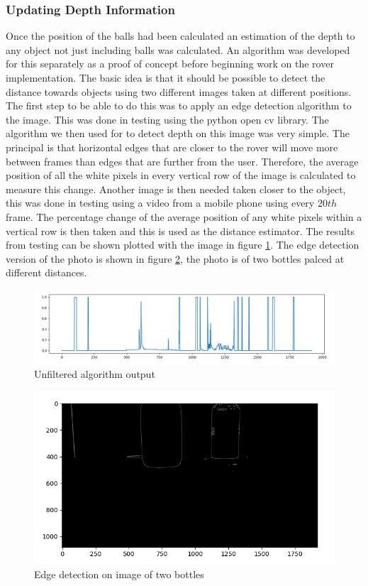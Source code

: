\documentclass[10pt,twoside]{article}
\begin{document}
\subsubsection{Updating Depth Information}
Once the position of the balls had been calculated an estimation of the depth to any object not just including balls was calculated. An algorithm was developed for this separately as a proof of concept before beginning work on the rover implementation. The basic idea is that it should be possible to detect the distance towards objects using two different images taken at different positions. The first step to be able to do this was to apply an edge detection algorithm to the image. This was done in testing using the python open cv library. The algorithm we then used for to detect depth on this image was very simple. The principal is that horizontal edges that are closer to the rover will move more between frames than edges that are further from the user. Therefore, the average position of all the white pixels in every vertical row of the image is calculated to measure this change. Another image is then needed taken closer to the object, this was done in testing using a video from a mobile phone using every $20th$ frame. The percentage change of the average position of any white pixels within a vertical row is then taken and this is used as the distance estimator. The results from testing can be shown plotted with the image in figure \ref{fig:CommandUnfilteredVision}. The edge detection version of the photo is shown in figure \ref{fig:Commandbottles}, the photo is of two bottles palced at different distances.

\begin{figure}[hbt]
    \centering
    \includegraphics[scale = 0.4]{Commandunfilteredvision.png}
    \caption{Unfiltered algorithm output}
    \label{fig:CommandUnfilteredVision}
\end{figure}


\begin{figure}[hbt]
    \centering
    \includegraphics[scale = 0.6]{Commandbottles.png}
    \caption{Edge detection on image of two bottles}
    \label{fig:Commandbottles}
\end{figure}
\end{document}
